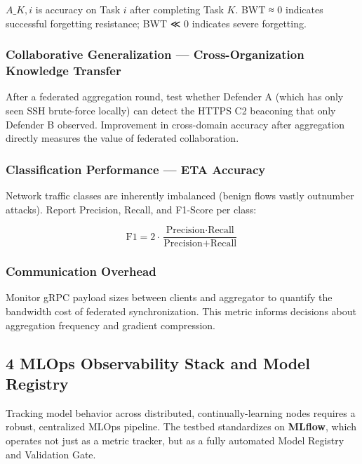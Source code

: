 \documentclass[conference]{IEEEtran}
\begin{document}
$A\_{K,i}$ is accuracy on Task $i$ after completing Task $K$. BWT ≈ 0 indicates successful forgetting resistance; BWT ≪ 0 indicates severe forgetting.


\subsubsection{Collaborative Generalization — Cross-Organization Knowledge Transfer}

After a federated aggregation round, test whether Defender A (which has only seen SSH brute-force locally) can detect the HTTPS C2 beaconing that only Defender B observed. Improvement in cross-domain accuracy after aggregation directly measures the value of federated collaboration.


\subsubsection{Classification Performance — ETA Accuracy}

Network traffic classes are inherently imbalanced (benign flows vastly outnumber attacks). Report Precision, Recall, and F1-Score per class:

$$\text{F1} = 2 \cdot \frac{\text{Precision} \cdot \text{Recall}}{\text{Precision} + \text{Recall}}$$


\subsubsection{Communication Overhead}

Monitor gRPC payload sizes between clients and aggregator to quantify the bandwidth cost of federated synchronization. This metric informs decisions about aggregation frequency and gradient compression.


\subsection{4 MLOps Observability Stack and Model Registry}

Tracking model behavior across distributed, continually-learning nodes requires a robust, centralized MLOps pipeline. The testbed standardizes on \textbf{MLflow}, which operates not just as a metric tracker, but as a fully automated Model Registry and Validation Gate.
\end{document}

